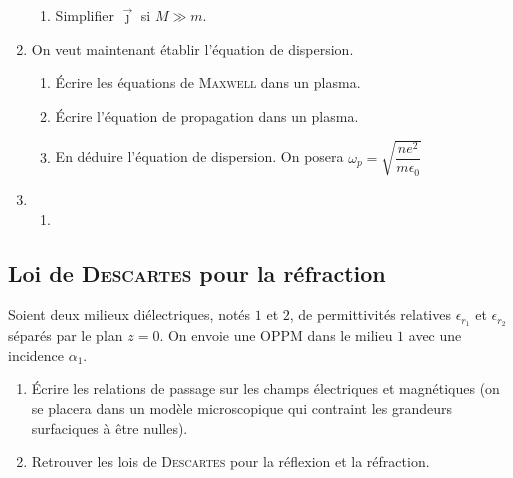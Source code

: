 \documentclass[a4paper,french,bookmarks]{book}
\begin{document}
\begin{enumerate}
\begin{enumerate}
            \item Simplifier $\vec \jmath$ si $M \gg m$.
        \end{enumerate}
        
        \item On veut maintenant établir l'équation de dispersion.
        
        \begin{enumerate}
            \item Écrire les équations de \textsc{Maxwell} dans un plasma.
            
            \item Écrire l'équation de propagation dans un plasma.
            
            \item En déduire l'équation de dispersion. On posera $\omega_p = \sqrt{\dfrac{ne^2}{m\epsilon_0}}$
        \end{enumerate}
        
        \item \begin{enumerate}
            \item 
        \end{enumerate}
    \end{enumerate}
    
    
    
    \subsection{Loi de \textsc{Descartes} pour la réfraction}
    
    Soient deux milieux diélectriques, notés $1$ et $2$, de permittivités relatives $\epsilon_{r_1}$ et $\epsilon_{r_2}$ séparés par le plan $z = 0$. On envoie une OPPM dans le milieu $1$ avec une incidence $\alpha_1$.
    
    \begin{enumerate}
        \item Écrire les relations de passage sur les champs électriques et magnétiques (on se placera dans un modèle microscopique qui contraint les grandeurs surfaciques à être nulles).
        
        
        \item Retrouver les lois de \textsc{Descartes} pour la réflexion et la réfraction.
    \end{enumerate}
    
\end{document}
